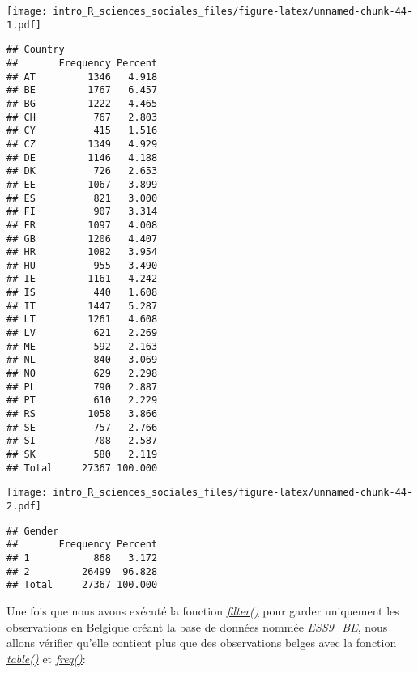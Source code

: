 \documentclass[
]{book}
\newenvironment{Shaded}{\begin{snugshade}}{\end{snugshade}}
\newcommand{\CommentTok}[1]{\textcolor[rgb]{0.56,0.35,0.01}{\textit{#1}}}
\newcommand{\FunctionTok}[1]{\textcolor[rgb]{0.00,0.00,0.00}{#1}}
\newcommand{\NormalTok}[1]{#1}
\newcommand{\OtherTok}[1]{\textcolor[rgb]{0.56,0.35,0.01}{#1}}
\newcommand{\SpecialCharTok}[1]{\textcolor[rgb]{0.00,0.00,0.00}{#1}}
\newcommand{\StringTok}[1]{\textcolor[rgb]{0.31,0.60,0.02}{#1}}
\begin{document}
\texttt{[image: intro\_R\_sciences\_sociales\_files/figure-latex/unnamed-chunk-44-1.pdf]}

\begin{verbatim}
## Country 
##       Frequency Percent
## AT         1346   4.918
## BE         1767   6.457
## BG         1222   4.465
## CH          767   2.803
## CY          415   1.516
## CZ         1349   4.929
## DE         1146   4.188
## DK          726   2.653
## EE         1067   3.899
## ES          821   3.000
## FI          907   3.314
## FR         1097   4.008
## GB         1206   4.407
## HR         1082   3.954
## HU          955   3.490
## IE         1161   4.242
## IS          440   1.608
## IT         1447   5.287
## LT         1261   4.608
## LV          621   2.269
## ME          592   2.163
## NL          840   3.069
## NO          629   2.298
## PL          790   2.887
## PT          610   2.229
## RS         1058   3.866
## SE          757   2.766
## SI          708   2.587
## SK          580   2.119
## Total     27367 100.000
\end{verbatim}

\begin{Shaded}
\end{Shaded}

\texttt{[image: intro\_R\_sciences\_sociales\_files/figure-latex/unnamed-chunk-44-2.pdf]}

\begin{verbatim}
## Gender 
##       Frequency Percent
## 1           868   3.172
## 2         26499  96.828
## Total     27367 100.000
\end{verbatim}

Une fois que nous avons exécuté la fonction \href{https://dplyr.tidyverse.org/reference/filter.html}{\emph{filter()}} pour garder uniquement les observations en Belgique créant la base de données nommée \emph{ESS9\_BE}, nous allons vérifier qu'elle contient plus que des observations belges avec la fonction \href{https://www.rdocumentation.org/packages/base/versions/3.6.2/topics/table}{\emph{table()}} et \href{https://www.rdocumentation.org/packages/descr/versions/1.1.5/topics/freq}{\emph{freq()}}:

\begin{Shaded}
\end{Shaded}
\end{document}
